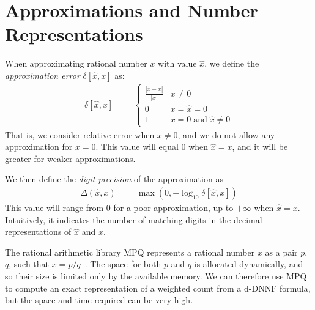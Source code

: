 \documentclass[letterpaper,USenglish,cleveref, autoref, thm-restate]{lipics-v2021}
\newcommand{\approximate}[1]{\hat{#1}}
\newcommand{\approxx}{\approximate{x}}
\newcommand{\aerror}{\delta}
\newcommand{\digitprecision}{\Delta}
\begin{document}
\section{Approximations and Number Representations}
\label{sect:background:numbers}

When approximating rational number $x$ with value $\approximate{x}$, we
define the \emph{approximation error} $\aerror[\approxx, x]$ as:
\begin{eqnarray}
\aerror[\approxx, x] & = & \left\{ \begin{array}{ll}
  \frac{|\approxx - x|}{|x|}  & x \not = 0\\
  0 & x  = \approxx = 0\\
  1 & x = 0 \; \textrm{and} \; \approxx \not = 0
  \end{array} \right. \label{eqn:approx:error}
\end{eqnarray}
That is, we consider relative error when $x \not = 0$, and we do not allow any approximation for $x = 0$.
This value will equal 0 when $\approxx=x$, and it will be greater for weaker approximations.

We then define the \emph{digit precision} of the approximation as
\begin{eqnarray}
\digitprecision(\approxx, x) & = & \max(0, -\log_{10} \aerror[\approxx, x]) \label{eqn:digitprecision} 
\end{eqnarray}
This value will range from $0$ for a poor approximation, up to $+\infty$ when $\approxx=x$.
Intuitively, it indicates the number of matching digits in the decimal representations of $\approxx$ and $x$.

The rational arithmetic library MPQ represents a rational number $x$
as a pair $p$, $q$, such that $x = p/q$~\cite{knuth:rational:1981}.
The space for both $p$ and $q$ is allocated dynamically, and
so their size is limited only by the available memory.  We can
therefore use MPQ to compute an exact representation of a weighted
count from a d-DNNF formula, but the space and time required can be very high.
\end{document}
